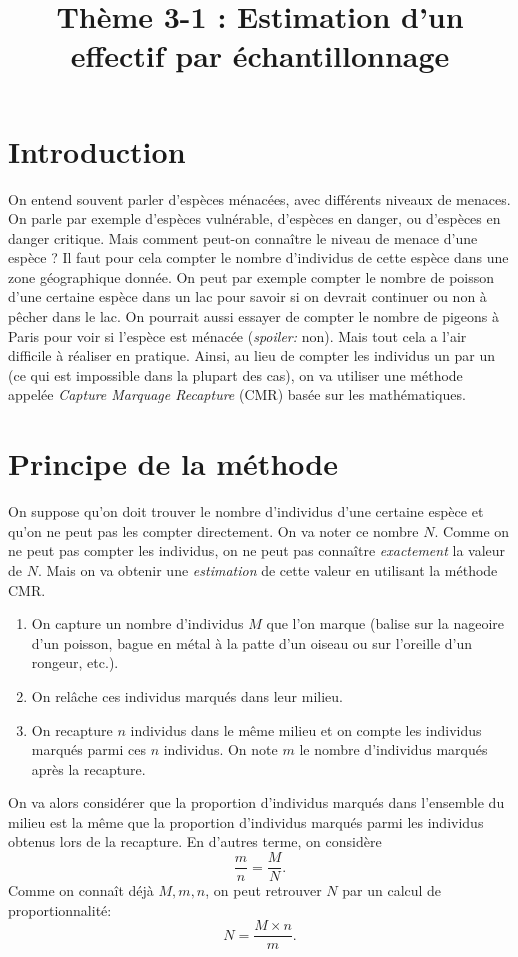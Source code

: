 \documentclass[11pt]{article}
\title{Thème 3-1 : Estimation d'un effectif par échantillonnage}
\date{}
\author{}
\begin{document}
\maketitle\thispagestyle{fancy}

\section{Introduction}

On entend souvent parler d'espèces ménacées, avec différents niveaux de
menaces. On parle par exemple d'espèces vulnérable, d'espèces en danger, ou
d'espèces en danger critique. Mais comment peut-on connaître le niveau de
menace d'une espèce ? Il faut pour cela compter le nombre d'individus de
cette espèce dans une zone géographique donnée. On peut par exemple compter le
nombre de poisson d'une certaine espèce dans un lac pour savoir si on devrait
continuer ou non à pêcher dans le lac. On pourrait aussi essayer
de compter le nombre de pigeons à Paris pour voir si l'espèce est ménacée
(\emph{spoiler:} non). Mais tout cela a l'air difficile à
réaliser en pratique. Ainsi, au lieu de compter les individus un par un (ce qui
est impossible dans la plupart des cas), on va utiliser une méthode appelée
\emph{Capture Marquage Recapture} (CMR) basée sur les mathématiques.

\section{Principe de la méthode}

On suppose qu'on doit trouver le nombre d'individus d'une certaine espèce et
qu'on ne peut pas les compter directement. On va noter ce nombre $N$. Comme on
ne peut pas compter les individus, on ne peut pas connaître \emph{exactement} la
valeur de $N$. Mais on va obtenir une \emph{estimation} de cette valeur en
utilisant la méthode CMR.
\begin{enumerate}
  \item On capture un nombre d'individus $M$ que l'on marque (balise sur la
    nageoire d'un poisson, bague en métal à la patte d'un oiseau ou sur
    l'oreille d'un rongeur, etc.).
  \item On rel\^ache ces individus marqués dans leur milieu.
  \item On recapture $n$ individus dans le même milieu et on compte les
    individus marqués parmi ces $n$ individus. On note $m$ le nombre d'individus
    marqués après la recapture.
\end{enumerate}
On va alors considérer que la proportion d'individus marqués dans l'ensemble du
milieu est la même que la proportion d'individus marqués parmi les individus
obtenus lors de la recapture. En d'autres terme, on considère
\[
  \frac{m}{n} = \frac{M}{N}.
\]
Comme on connaît déjà $M, m, n$, on peut retrouver $N$ par un calcul de
proportionnalité:
\[
  N = \frac{M\times n}{m}.
\]
\end{document}

